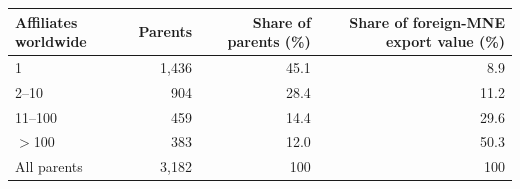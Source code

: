\begin{tabular}{lrrr}
\toprule
Affiliates worldwide & Parents & Share of parents (\%) & Share of foreign-MNE export value (\%) \\
\midrule
1 & 1,436 & 45.1 & 8.9 \\
2--10 & 904 & 28.4 & 11.2 \\
11--100 & 459 & 14.4 & 29.6 \\
$>$100 & 383 & 12.0 & 50.3 \\
\midrule
All parents & 3,182 & 100 & 100 \\
\bottomrule
\end{tabular}
